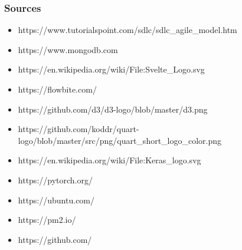\documentclass{beamer}
\begin{document}
\begin{frame}
    \frametitle{Sources}
    \begin{itemize}
        \item https://www.tutorialspoint.com/sdlc/sdlc\_agile\_model.htm
        \item https://www.mongodb.com
        \item https://en.wikipedia.org/wiki/File:Svelte\_Logo.svg
        \item https://flowbite.com/
        \item https://github.com/d3/d3-logo/blob/master/d3.png
        \item https://github.com/koddr/quart-logo/blob/master/src/png/quart\_short\_logo\_color.png
        \item https://en.wikipedia.org/wiki/File:Keras\_logo.svg
        \item https://pytorch.org/
        \item https://ubuntu.com/
        \item https://pm2.io/
        \item https://github.com/
    \end{itemize}
    \centering
\end{frame}
\end{document}
